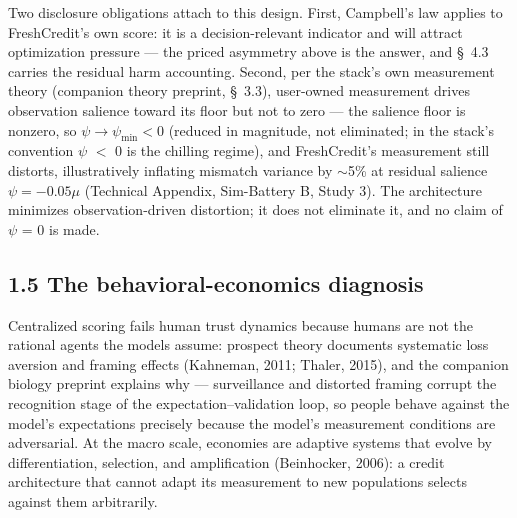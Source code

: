 \documentclass[
]{article}
\begin{document}
Two disclosure obligations attach to this design. First, Campbell's law
applies to FreshCredit's own score: it is a decision-relevant indicator
and will attract optimization pressure --- the priced asymmetry above is
the answer, and §~4.3 carries the residual harm accounting. Second, per
the stack's own measurement theory (companion theory preprint, §~3.3),
user-owned measurement drives observation salience toward its floor but
not to zero --- the salience floor is nonzero, so
\(\psi \rightarrow \psi_{\min} < 0\) (reduced in magnitude, not
eliminated; in the stack's convention \(\psi\) \(<\) 0 is the chilling
regime), and FreshCredit's measurement still distorts, illustratively
inflating mismatch variance by \(\sim\)5\% at residual salience
\(\psi = -0.05\mu\) (Technical Appendix, Sim-Battery B, Study 3). The
architecture minimizes observation-driven distortion; it does not
eliminate it, and no claim of \(\psi\) = 0 is made.

\subsection{1.5 The behavioral-economics
diagnosis}\label{the-behavioral-economics-diagnosis}

Centralized scoring fails human trust dynamics because humans are not
the rational agents the models assume: prospect theory documents
systematic loss aversion and framing effects (Kahneman, 2011; Thaler,
2015), and the companion biology preprint explains why --- surveillance
and distorted framing corrupt the recognition stage of the
expectation--validation loop, so people behave against the model's
expectations precisely because the model's measurement conditions are
adversarial. At the macro scale, economies are adaptive systems that
evolve by differentiation, selection, and amplification (Beinhocker,
2006): a credit architecture that cannot adapt its measurement to new
populations selects against them arbitrarily.
\end{document}
